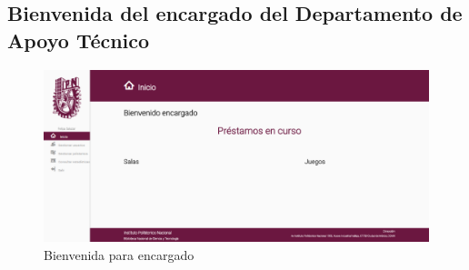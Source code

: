 
\subsection{Bienvenida del encargado del Departamento de 
	Apoyo Técnico}
	
	\begin{figure}[hbtp]
		\centering
		\includegraphics[scale=0.3]{images/Interfaz/IUGS02_binevenida.png}
		\caption{Bienvenida para encargado}
	\end{figure}